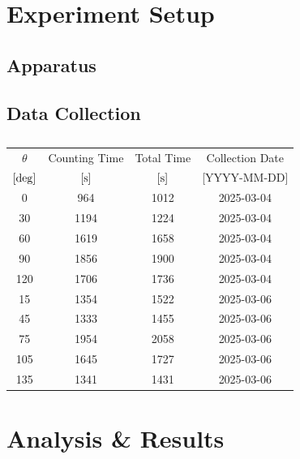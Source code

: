 \documentclass[aps,twocolumn,secnumarabic,balancelastpage,amsmath,amssymb,nofootinbib,floatfix]{revtex4-1}
\begin{document}
\section{Experiment Setup}
\label{sec:experiment}

\subsection{Apparatus}
\label{ssec:apparatus}



\subsection{Data Collection}
\label{ssec:data_collection}

\begin{table}
    \centering
    \addtolength{\tabcolsep}{3pt}
    \def\arraystretch{1.2}
    \begin{tabular}{c c c c}
        \hline
        $\theta$ & Counting Time & Total Time & Collection Date \\ [0ex]
        $[\rm{deg}]$ & $[\rm{s}]$ & $[\rm{s}]$ & [YYYY-MM-DD] \\ [1ex]
        \hline\hline

        0 & 964 & 1012 & 2025-03-04 \\
        30 & 1194 & 1224 & 2025-03-04 \\
        60 & 1619 & 1658 & 2025-03-04 \\
        90 & 1856 & 1900 & 2025-03-04 \\
        120 & 1706 & 1736 & 2025-03-04 \\
        15 & 1354 & 1522 & 2025-03-06 \\
        45 & 1333 & 1455 & 2025-03-06 \\
        75 & 1954 & 2058 & 2025-03-06 \\
        105 & 1645 & 1727 & 2025-03-06 \\
        135 & 1341 & 1431 & 2025-03-06 \\
        
        \hline
        
    \end{tabular}
    \caption{}
    \label{tab:data_collection}    
\end{table}


\section{Analysis \& Results}
\label{sec:result}
\end{document}

